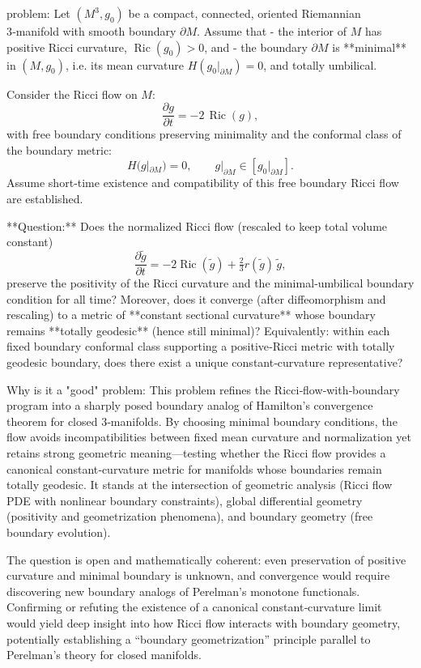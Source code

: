 problem:  
Let \( (M^3, g_0) \) be a compact, connected, oriented Riemannian 3‑manifold with smooth boundary \( \partial M \). Assume that  
- the interior of \(M\) has positive Ricci curvature, \(\operatorname{Ric}(g_0) > 0\), and  
- the boundary \( \partial M \) is **minimal** in \( (M, g_0) \), i.e. its mean curvature \(H(g_0|_{\partial M}) = 0\), and totally umbilical.  

Consider the Ricci flow on \(M\):  
\[
\frac{\partial g}{\partial t} = -2\,\operatorname{Ric}(g),
\]
with free boundary conditions preserving minimality and the conformal class of the boundary metric:  
\[
H(g|_{\partial M}) = 0,\qquad g|_{\partial M} \in [g_0|_{\partial M}].
\]
Assume short‑time existence and compatibility of this free boundary Ricci flow are established.

**Question:**  
Does the normalized Ricci flow (rescaled to keep total volume constant)  
\[
\frac{\partial \tilde g}{\partial t} = -2\operatorname{Ric}(\tilde g) + \tfrac{2}{3} r(\tilde g)\,\tilde g,
\]
preserve the positivity of the Ricci curvature and the minimal‑umbilical boundary condition for all time?  Moreover, does it converge (after diffeomorphism and rescaling) to a metric of **constant sectional curvature** whose boundary remains **totally geodesic** (hence still minimal)?  Equivalently: within each fixed boundary conformal class supporting a positive‑Ricci metric with totally geodesic boundary, does there exist a unique constant‑curvature representative?

Why is it a "good" problem:  
This problem refines the Ricci‑flow‑with‑boundary program into a sharply posed boundary analog of Hamilton’s convergence theorem for closed 3‑manifolds. By choosing minimal boundary conditions, the flow avoids incompatibilities between fixed mean curvature and normalization yet retains strong geometric meaning—testing whether the Ricci flow provides a canonical constant‑curvature metric for manifolds whose boundaries remain totally geodesic. It stands at the intersection of geometric analysis (Ricci flow PDE with nonlinear boundary constraints), global differential geometry (positivity and geometrization phenomena), and boundary geometry (free boundary evolution).  

The question is open and mathematically coherent: even preservation of positive curvature and minimal boundary is unknown, and convergence would require discovering new boundary analogs of Perelman’s monotone functionals. Confirming or refuting the existence of a canonical constant‑curvature limit would yield deep insight into how Ricci flow interacts with boundary geometry, potentially establishing a “boundary geometrization” principle parallel to Perelman’s theory for closed manifolds.